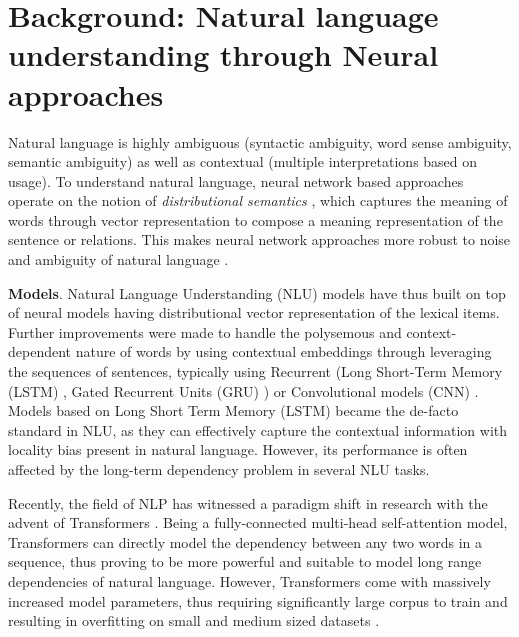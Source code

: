 \documentclass[12pt]{article}
\newcommand{\xhdr}[1]{{\noindent\bfseries #1}.}
\begin{document}




\section{Background: Natural language understanding through Neural approaches}

Natural language is highly ambiguous (syntactic ambiguity, word sense ambiguity, semantic ambiguity) as well as contextual (multiple interpretations based on usage). To understand natural language, neural network based approaches operate on the notion of \textit{distributional semantics} \cite{bordes2013translating}, which captures the meaning of words through vector representation to compose a meaning representation of the sentence or relations. This makes neural network approaches more robust to noise and ambiguity of natural language \cite{bengio2013representation}.

\xhdr{Models} Natural Language Understanding (NLU) models have thus built on top of neural models having distributional vector representation of the lexical items. Further improvements were made to handle the polysemous and context-dependent nature of words by using contextual embeddings through leveraging the sequences of sentences, typically using Recurrent (Long Short-Term Memory (LSTM) \cite{hochreiter1997long}, Gated Recurrent Units (GRU) \cite{cho2014learning}) or Convolutional models (CNN) \cite{kim2014convolutional}. Models based on Long Short Term Memory (LSTM) became the de-facto standard in NLU, as they can effectively capture the contextual information with locality bias present in natural language. However, its performance is often affected by the long-term dependency problem in several NLU tasks.

Recently, the field of NLP has witnessed a paradigm shift in research with the advent of Transformers \cite{vaswani-etal-2017-attention}. Being a fully-connected multi-head self-attention model, Transformers can directly model the dependency between any two words in a sequence, thus proving to be more powerful and suitable to model long range dependencies of natural language. However, Transformers come with massively increased model parameters, thus requiring significantly large corpus to train and resulting in overfitting on small and medium sized datasets \cite{radford2018improving}.
\end{document}
